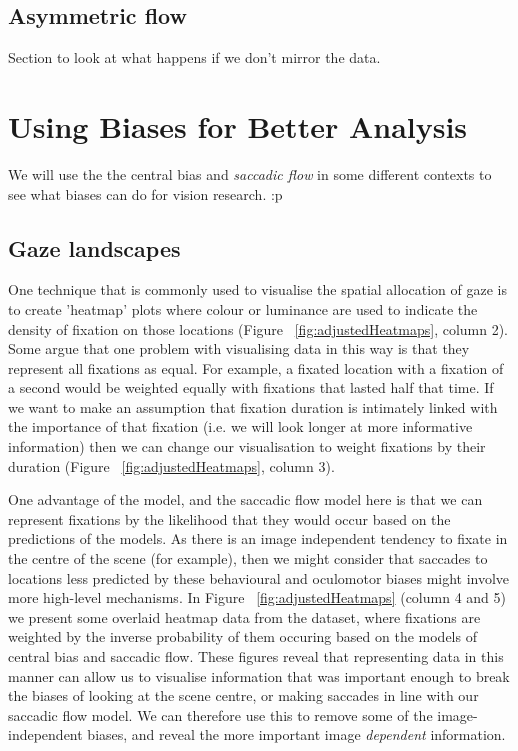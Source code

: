 \documentclass[a4paper, onecolumn, oneside, 11pt]{article}
\begin{document}
\subsection{Asymmetric flow}

Section to look at what happens if we don't mirror the data.


\section{Using Biases for Better Analysis}

We will use the the central bias \citep{clarke-tatler2014} and \textit{saccadic flow} in some different contexts to see what biases can do for vision research. :p


\subsection{Gaze landscapes}

One technique that is commonly used to visualise the spatial allocation of gaze is to create 'heatmap' plots where colour or luminance are used to indicate the density of fixation on those locations (Figure ~\ref{fig:adjustedHeatmaps}, column 2). Some argue that one problem with visualising data in this way is that they represent all fixations as equal. For example, a fixated location with a fixation of a second would be weighted equally with fixations that lasted half that time. If we want to make an assumption that fixation duration is intimately linked with the importance of that fixation (i.e. we will look longer at more informative information) then we can change our visualisation to weight fixations by their duration (Figure ~\ref{fig:adjustedHeatmaps}, column 3).

One advantage of the \citep{clarke-tatler2014} model, and the saccadic flow model here is that we can represent fixations by the likelihood that they would occur based on the predictions of the models. As there is an image independent tendency to fixate in the centre of the scene (for example), then we might consider that saccades to locations less predicted by these behavioural and oculomotor biases might involve more high-level mechanisms. In Figure ~\ref{fig:adjustedHeatmaps} (column 4 and 5) we present some overlaid heatmap data from the \citep{clarke2013} dataset, where fixations are weighted by the inverse probability of them occuring based on the models of central bias and saccadic flow. These figures reveal that representing data in this manner can allow us to visualise information that was important enough to break the biases of looking at the scene centre, or making saccades in line with our saccadic flow model. We can therefore use this to remove some of the image-independent biases, and reveal the more important image \emph{dependent} information.
\end{document}
